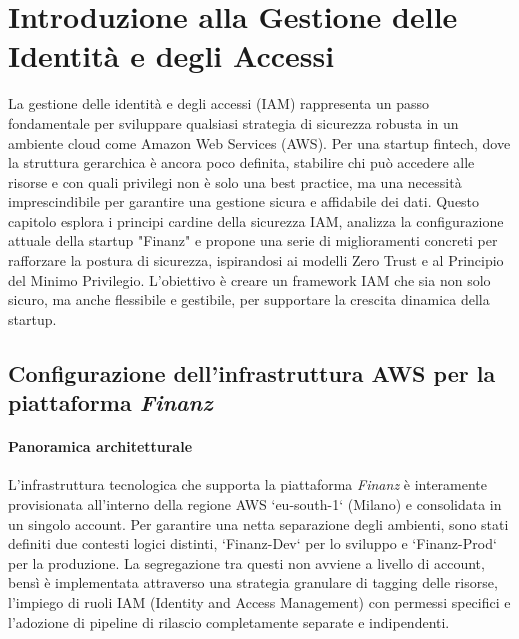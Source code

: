 \section{Introduzione alla Gestione delle Identità e degli Accessi}
La gestione delle identità e degli accessi (IAM) rappresenta un passo fondamentale per sviluppare qualsiasi strategia di sicurezza robusta in un ambiente cloud come Amazon Web Services (AWS). Per una startup fintech, dove la struttura gerarchica è ancora poco definita, stabilire chi può accedere alle risorse e con quali privilegi non è solo una best practice, ma una necessità imprescindibile per garantire una gestione sicura e affidabile dei dati. Questo capitolo esplora i principi cardine della sicurezza IAM, analizza la configurazione attuale della startup "Finanz" e propone una serie di miglioramenti concreti per rafforzare la postura di sicurezza, ispirandosi ai modelli Zero Trust e al Principio del Minimo Privilegio. L'obiettivo è creare un framework IAM che sia non solo sicuro, ma anche flessibile e gestibile, per supportare la crescita dinamica della startup.



\subsection{Configurazione dell'infrastruttura AWS per la piattaforma \textit{Finanz}}
\label{subsec:aws_infrastruttura_attuale_cap4_narrativo}

\paragraph{Panoramica architetturale}
L'infrastruttura tecnologica che supporta la piattaforma \textit{Finanz} è interamente provisionata all'interno della regione AWS `eu-south-1` (Milano) e consolidata in un singolo account. Per garantire una netta separazione degli ambienti, sono stati definiti due contesti logici distinti, `Finanz-Dev` per lo sviluppo e `Finanz-Prod` per la produzione. La segregazione tra questi non avviene a livello di account, bensì è implementata attraverso una strategia granulare di tagging delle risorse, l'impiego di ruoli IAM (Identity and Access Management) con permessi specifici e l'adozione di pipeline di rilascio completamente separate e indipendenti.

